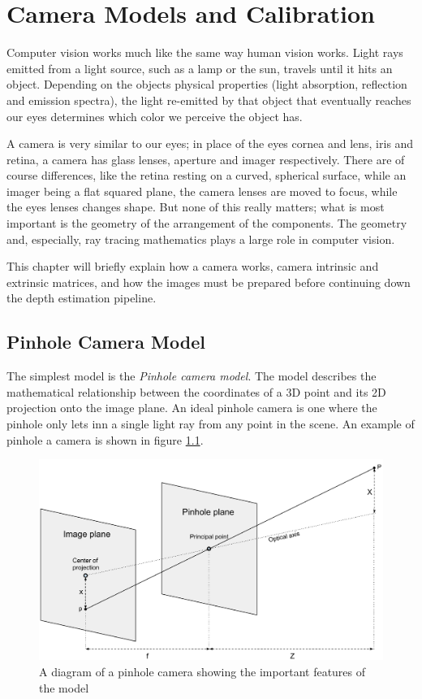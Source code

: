 \chapter{Camera Models and Calibration}

Computer vision works much like the same way human vision works. Light rays
emitted from a light source, such as a lamp or the sun, travels until it hits
an object. Depending on the objects physical properties (light absorption,
reflection and emission spectra), the light re-emitted by that object that
eventually reaches our eyes determines which color we perceive the object has.

A camera is very similar to our eyes; in place of the eyes cornea and lens,
iris and retina, a camera has glass lenses, aperture and imager respectively.
There are of course differences, like the retina resting on a curved,
spherical surface, while an imager being a flat squared plane, the camera
lenses are moved to focus, while the eyes lenses changes shape. But none of
this really matters; what is most important is the geometry of the arrangement
of the components. The geometry and, especially, ray tracing mathematics plays
a large role in computer vision.

This chapter will briefly explain how a camera works, camera intrinsic and
extrinsic matrices, and how the images must be prepared before continuing down
the depth estimation pipeline.

\section{Pinhole Camera Model}

The simplest model is the \textit{Pinhole camera model}. The model describes
the mathematical relationship between the coordinates of a 3D point and its 2D
projection onto the image plane. An ideal pinhole camera is one where the
pinhole only lets inn a single light ray from any point in the scene.  An
example of pinhole a camera is shown in figure \ref{fig:pinhole-camera-model}.

\begin{figure}[h]
  \centering
  \label{fig:pinhole-camera-model}
  \includegraphics[width=\textwidth]{images/Pinhole-camera-model.pdf}
  \caption{A diagram of a pinhole camera showing the important features of the model}
\end{figure}

